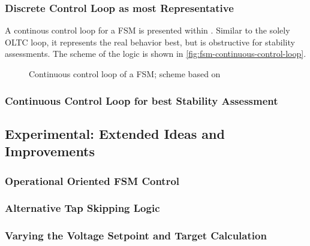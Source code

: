 \subsubsection{Discrete Control Loop as most Representative}
A continous control loop for a \acs{FSM} is presented within \textcite{burlakinEnhancedVoltageControl2024,burlakinEnhancingVariableShunt2024}. Similar to the solely \acs{OLTC} loop, it represents the real behavior best, but is obstructive for stability assessments. The scheme of the logic is shown in \autoref{fig:fsm-continuous-control-loop}.

\begin{figure}[htb!]
        \centering
        \caption{Continuous control loop of a \acs{FSM}; scheme based on \textcite{burlakinEnhancedVoltageControl2024}}
        \label{fig:fsm-continuous-control-loop}
\end{figure}

\subsubsection{Continuous Control Loop for best Stability Assessment}

\subsection{Experimental: Extended Ideas and Improvements}

\subsubsection{Operational Oriented FSM Control}

\subsubsection{Alternative Tap Skipping Logic}

\subsubsection{Varying the Voltage Setpoint and Target Calculation}




